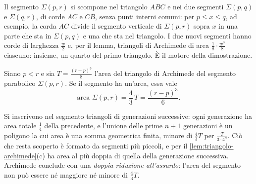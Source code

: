 Il segmento $\Sigma(p,r)$ si scompone nel triangolo $ABC$ e nei due segmenti
$\Sigma(p,q)$ e $\Sigma(q,r)$, di corde $AC$ e $CB$, senza punti interni comuni: per
$p\le x\le q$, ad esempio, la corda $AC$ divide il segmento verticale di $\Sigma(p,r)$
sopra $x$ in una parte che sta in $\Sigma(p,q)$ e una che sta nel triangolo. I due nuovi
segmenti hanno corde di larghezza $\frac w2$ e, per il lemma, triangoli di Archimede di
area $\frac18\cdot\frac{w^{3}}8$ ciascuno: insieme, un quarto del primo triangolo. È il
motore della dimostrazione.

\begin{proposizione}\label{prop:quadratura-archimede}
Siano $p<r$ e sia $T=\frac{(r-p)^{3}}8$ l'area del triangolo di Archimede del segmento
parabolico $\Sigma(p,r)$. Se il segmento ha un'area, essa vale
\begin{equation}\label{eq:quadratura-archimede}
  \text{area }\Sigma(p,r)=\frac43\,T=\frac{(r-p)^{3}}6 .
\end{equation}
\end{proposizione}

\begin{schema}
\end{schema}

\begin{strategia}
Si inscrivono nel segmento triangoli di generazioni successive: ogni generazione ha
area totale $\frac14$ della precedente, e l'unione delle prime $n+1$ generazioni è un
poligono la cui area è una somma geometrica finita, minore di $\frac43T$ per
$\frac T{3\cdot4^{n}}$. Ciò che resta scoperto è formato da segmenti più piccoli, e per
il \cref{lem:triangolo-archimede}(c) ha area al più doppia di quella della generazione
successiva. Archimede conclude con una \emph{doppia riduzione all'assurdo}: l'area del
segmento non può essere né maggiore né minore di $\frac43T$.
\end{strategia}

